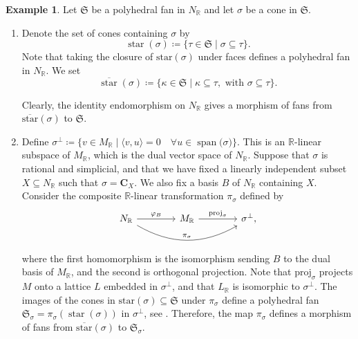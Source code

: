 \documentclass[10pt,twoside, a4paper,reqno]{amsart}
\DeclareMathOperator{\spann}{span}
\DeclareMathOperator{\starr}{star}
\newcommand{\sth}{\;\vert\;}
\newcommand{\Sfrak}{\mathfrak{S}}
\newcommand{\R}{\mathbb{R}}
\newcommand{\boldC}{\mathbf{C}}
\newcommand{\Sfan}{\mathfrak{S}}
\theoremstyle{definition}
\newtheorem{example}[theorem]{Example}
\begin{document}
\begin{example}\label{eg:orthproj}
    Let $\Sfrak$ be a polyhedral fan in $N_{\R}$ and let $\sigma$ be a cone in $\Sfan$.
    \begin{enumerate}
        \item\label{eg:orthproj1} Denote the set of cones containing $\sigma$ by
        \begin{equation}\label{eq:star}
 	 \starr(\sigma) \coloneqq \{\tau\in\Sfan \sth \sigma\subseteq \tau \}.
        \end{equation}
        Note that taking the closure {of $\mathrm{star}(\sigma)$} under faces defines a polyhedral fan in $N_{\R}$. We set
        \[ \overline{\starr}(\sigma) \coloneqq \{ \kappa \in \Sfan \sth \kappa \subseteq \tau, \text{ with } {\sigma \subseteq \tau} \}. \]
        
        Clearly, the identity endomorphism on $N_{\R}$ gives a morphism of fans from $\overline{\mathrm{star}}(\sigma)$ to $\Sfan$.  
        \item\label{eg:orthproj_proj} 
        Define $\sigma^{\perp} \coloneqq \{v\in M_{\R} \sth \langle v,u\rangle = 0 \quad \forall u\in {\spann(}\sigma{)} \}$.
        This is an $\R$-linear subspace of $M_{\R}$, which is the dual vector space of $N_{\R}$.
        Suppose that $\sigma$ is rational and simplicial, and that we have fixed a linearly independent subset $X\subseteq N{_{\R}}$ such that $\sigma = \boldC_X$. We also fix a basis $B$ of $N{_{\R}}$ containing $X$. Consider the composite $\R$-linear transformation $\pi_{\sigma}$ defined by
        \begin{equation}\label{eq:othcomphomomo}
            \begin{tikzcd}[column sep=4em]
            N_{\R} \arrow[r,"\varphi_B"] \arrow[rr,"\pi_{\sigma}", bend right] & M_{\R} \arrow[r,"\mathrm{proj}_{\sigma}"] & \sigma^{\perp},
            \end{tikzcd}
        \end{equation}
        where the first homomorphism is the isomorphism sending $B$ to the dual basis of $M_{\R}$, and the second is orthogonal projection. Note that $\mathrm{proj}_{\sigma}$ projects $M$ onto a lattice $L$ embedded in $\sigma^{\perp}$, and that $L_{\R}$ is isomorphic to $\sigma^{\perp}$. 
        The images of the cones in $\mathrm{star}(\sigma) \subseteq \Sfan$ under $\pi_{\sigma}$ define a polyhedral fan $\Sfan_\sigma = {\pi_{\sigma}(\starr(\sigma))}$ in $\sigma^\perp${, see \cite[p. 52]{Ful93}.} Therefore, the map $\pi_{\sigma}$ defines a morphism of fans from $\overline{\mathrm{star}}(\sigma)$ to $\Sfan_\sigma$.
    \end{enumerate}
\end{example}
\end{document}
